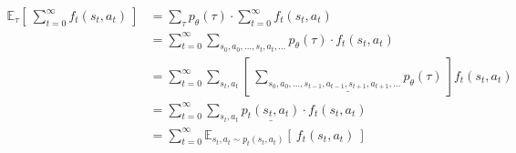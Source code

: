 \begin{align}
\mathbb{E}_{\tau} \left\lbrack\ \sum_{t=0}^{\infty} f_t(s_t,a_t) \ \right\rbrack
&= \sum_{\tau} p_\theta(\tau) \cdot \sum_{t=0}^{\infty} f_t(s_t,a_t) \\
&= \sum_{t=0}^{\infty} \sum_{s_0,a_0,\dots,s_t,a_t,\dots} p_\theta(\tau) \cdot f_t(s_t,a_t) \\
&= \sum_{t=0}^{\infty} \sum_{s_t,a_t} \left\lbrack\ \underline{\sum_{s_0,a_0,\dots,s_{t-1},a_{t-1},s_{t+1},a_{t+1},\dots} p_\theta(\tau)} \ \right\rbrack f_t(s_t,a_t) \\
&= \sum_{t=0}^{\infty} \sum_{s_t,a_t} \underline{p_t(s_t,a_t)} \cdot f_t(s_t,a_t) \\
&= \sum_{t=0}^{\infty} \mathbb{E}_{s_t,a_t \sim p_t(s_t,a_t)} \left\lbrack\ f_t(s_t,a_t) \ \right\rbrack
\end{align}